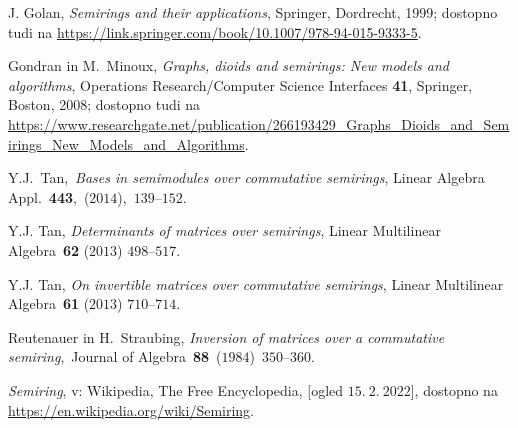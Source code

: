 \documentclass[mat1]{fmfdelo}
\begin{document}
\begin{thebibliography}{99}
	
	 J. Golan, \emph{Semirings and their applications}, Springer, Dordrecht, 1999; dostopno tudi na \url{https://link.springer.com/book/10.1007/978-94-015-9333-5}. 
	
	 Gondran in M.~Minoux, \emph{Graphs, dioids and semirings: New models and algorithms}, Operations Research/Computer Science Interfaces \textbf{41}, Springer, Boston, 2008; dostopno tudi na \url{https://www.researchgate.net/publication/266193429_Graphs_Dioids_and_Semirings_New_Models_and_Algorithms}.
	
	 Y.J.~Tan,~\emph{Bases in semimodules over commutative semirings}, Linear Algebra Appl.~\textbf{443},~($2014$),~$139$–$152$.
	
	 Y.J. Tan, \emph{Determinants of matrices over semirings}, Linear Multilinear Algebra~\textbf{62} ($2013$) $498$–$517$.
	
	 Y.J. Tan, \emph{On invertible matrices over commutative semirings}, Linear Multilinear Algebra~\textbf{61} ($2013$) $710$–$714$.
	
	 Reutenauer in H.~Straubing, \emph{Inversion of matrices over a commutative semiring},~Journal of Algebra~\textbf{88}~($1984$)~$350$–$360$.
	
	 \emph{Semiring}, v: Wikipedia, The Free Encyclopedia, [ogled $15.~2.~2022$], dostopno na \url{https://en.wikipedia.org/wiki/Semiring}.
	
\end{thebibliography}
\end{document}
